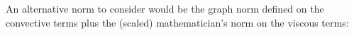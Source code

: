 \documentclass[Proposal.tex]{subfiles}
\begin{document}
An alternative norm to consider would be the graph norm defined on the convective terms plus the (scaled) mathematician's norm on the viscous terms:
\begin{equation}
\begin{aligned}
\end{aligned}
\end{equation}

%                                                                                
%                                                                                
% 
\end{document}
